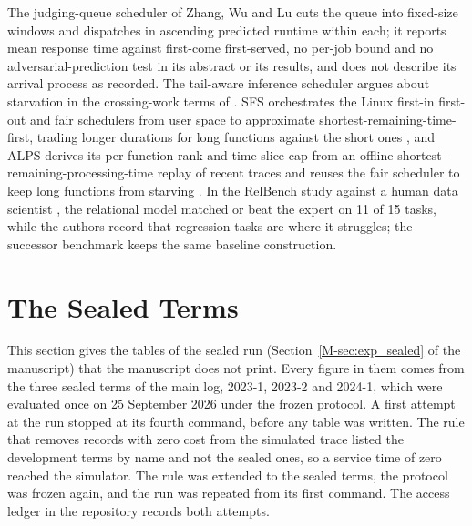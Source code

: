 \documentclass[mathematics,supfile,submit,moreauthors]{Definitions/mdpi}
\begin{document}
The judging-queue scheduler of Zhang, Wu and Lu \cite{zhang2024ojscheduling} cuts the
queue into fixed-size windows and dispatches in ascending predicted runtime within each;
it reports mean response time against first-come first-served, no per-job bound and no
adversarial-prediction test in its abstract or its results, and does not describe its
arrival process as recorded. The tail-aware inference
scheduler \cite{li2026tailaware} argues about starvation in the crossing-work terms of
\cite{yu2024boost}. SFS orchestrates the Linux first-in first-out and fair schedulers from
user space to approximate shortest-remaining-time-first, trading longer durations for
long functions against the short ones \cite{fu2022sfs}, and ALPS derives its per-function
rank and time-slice cap from an offline shortest-remaining-processing-time replay of
recent traces and reuses the fair scheduler to keep long functions from starving
\cite{fu2024alps}. In the RelBench study against a human
data scientist \cite{robinson2024relbench}, the relational model matched or beat the
expert on 11 of 15 tasks, while the authors record that regression tasks are where it
struggles; the successor benchmark \cite{gu2026relbenchv2} keeps the same baseline
construction.

\section{The Sealed Terms}
\label{sec:s_sealed}

This section gives the tables of the sealed run (Section~\ref*{M-sec:exp_sealed} of the
manuscript) that the manuscript does not print. Every figure in them comes from the three
sealed terms of the main log, 2023-1, 2023-2 and 2024-1, which were evaluated once on 25
September 2026 under the frozen protocol. A first attempt at the run stopped at its fourth
command, before any table was written. The rule that removes records with zero cost from
the simulated trace listed the development terms by name and not the sealed ones, so a
service time of zero reached the simulator. The rule was extended to the sealed terms, the
protocol was frozen again, and the run was repeated from its first command. The access
ledger in the repository records both attempts.
\end{document}
